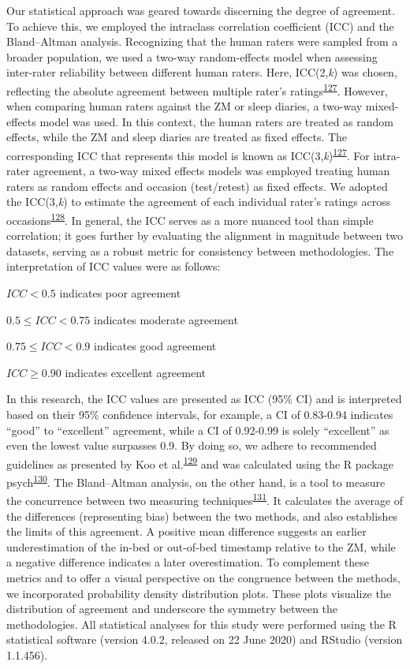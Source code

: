 \documentclass[
  10pt,
]{scrbook}
\begin{document}
Our statistical approach was geared towards discerning the degree of
agreement. To achieve this, we employed the intraclass correlation
coefficient (ICC) and the Bland--Altman analysis. Recognizing that the
human raters were sampled from a broader population, we used a two-way
random-effects model when assessing inter-rater reliability between
different human raters. Here, ICC(2,\emph{k}) was chosen, reflecting the
absolute agreement between multiple rater's
ratings\textsuperscript{\protect\hyperlink{ref-shrout_1979}{127}}.
However, when comparing human raters against the ZM or sleep diaries, a
two-way mixed-effects model was used. In this context, the human raters
are treated as random effects, while the ZM and sleep diaries are
treated as fixed effects. The corresponding ICC that represents this
model is known as
ICC(3,\emph{k})\textsuperscript{\protect\hyperlink{ref-shrout_1979}{127}}.
For intra-rater agreement, a two-way mixed effects models was employed
treating human raters as random effects and occasion (test/retest) as
fixed effects. We adopted the ICC(3,\emph{k}) to estimate the agreement
of each individual rater's ratings across
occasions\textsuperscript{\protect\hyperlink{ref-mcgraw_1996}{128}}. In
general, the ICC serves as a more nuanced tool than simple correlation;
it goes further by evaluating the alignment in magnitude between two
datasets, serving as a robust metric for consistency between
methodologies. The interpretation of ICC values were as follows:

\(ICC < 0.5\) indicates poor agreement

\(0.5 ≤ ICC < 0.75\) indicates moderate agreement

\(0.75 ≤ ICC < 0.9\) indicates good agreement

\(ICC ≥ 0.90\) indicates excellent agreement

In this research, the ICC values are presented as ICC (95\% CI) and is
interpreted based on their 95\% confidence intervals, for example, a CI
of 0.83-0.94 indicates ``good'' to ``excellent'' agreement, while a CI
of 0.92-0.99 is solely ``excellent'' as even the lowest value surpasses
0.9. By doing so, we adhere to recommended guidelines as presented by
Koo et
al.\textsuperscript{\protect\hyperlink{ref-koo_guideline_2016}{129}} and
was calculated using the R package
psych\textsuperscript{\protect\hyperlink{ref-psych}{130}}. The
Bland--Altman analysis, on the other hand, is a tool to measure the
concurrence between two measuring
techniques\textsuperscript{\protect\hyperlink{ref-bland_measuring_1999}{131}}.
It calculates the average of the differences (representing bias) between
the two methods, and also establishes the limits of this agreement. A
positive mean difference suggests an earlier underestimation of the
in-bed or out-of-bed timestamp relative to the ZM, while a negative
difference indicates a later overestimation. To complement these metrics
and to offer a visual perspective on the congruence between the methods,
we incorporated probability density distribution plots. These plots
visualize the distribution of agreement and underscore the symmetry
between the methodologies. All statistical analyses for this study were
performed using the R statistical software (version 4.0.2, released on
22 June 2020) and RStudio (version 1.1.456).
\end{document}
